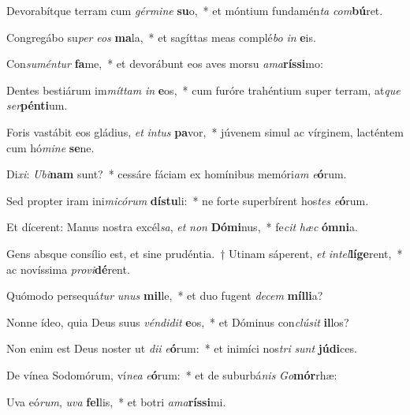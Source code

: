 \item Devorabítque terram cum \textit{gér}\textit{mi}\textit{ne} \textbf{su}o,~* et móntium fundamén\textit{ta} \textit{com}\textbf{bú}ret.
\item Congregábo su\textit{per} \textit{e}\textit{os} \textbf{ma}la,~* et sagíttas meas complé\textit{bo} \textit{in} \textbf{e}is.
\item Con\textit{su}\textit{mén}\textit{tur} \textbf{fa}me,~* et devorábunt eos aves morsu \textit{a}\textit{ma}\textbf{rís}\textbf{si}mo:
\item Dentes bestiárum im\textit{mít}\textit{tam} \textit{in} \textbf{e}os,~* cum furóre trahéntium super terram, at\textit{que} \textit{ser}\textbf{pén}\textbf{ti}um.
\item Foris vastábit eos gládius, \textit{et} \textit{in}\textit{tus} \textbf{pa}vor,~* júvenem simul ac vírginem, lacténtem cum hó\textit{mi}\textit{ne} \textbf{se}ne.
\item Di\textit{xi}: \textit{U}\textit{bi}\textbf{nam} sunt?~* cessáre fáciam ex homínibus memóri\textit{am} \textit{e}\textbf{ó}rum.
\item Sed propter iram ini\textit{mi}\textit{có}\textit{rum} \textbf{dís}\textbf{tu}li:~* ne forte superbírent hos\textit{tes} \textit{e}\textbf{ó}rum.
\item Et dícerent: Manus nostra excél\textit{sa}, \textit{et} \textit{non} \textbf{Dó}\textbf{mi}nus,~* fe\textit{cit} \textit{hæc} \textbf{óm}\textbf{ni}a.
\item Gens absque consílio est, et sine prudéntia.~† Utinam sáperent, \textit{et} \textit{in}\textit{tel}\textbf{lí}\textbf{ge}rent,~* ac novíssima \textit{pro}\textit{vi}\textbf{dé}rent.
\item Quómodo persequá\textit{tur} \textit{u}\textit{nus} \textbf{mil}le,~* et duo fugent \textit{de}\textit{cem} \textbf{míl}\textbf{li}a?
\item Nonne ídeo, quia Deus suus \textit{vén}\textit{di}\textit{dit} \textbf{e}os,~* et Dóminus con\textit{clú}\textit{sit} \textbf{il}los?
\item Non enim est Deus noster ut \textit{di}\textit{i} \textit{e}\textbf{ó}rum:~* et inimíci nos\textit{tri} \textit{sunt} \textbf{jú}\textbf{di}ces.
\item De vínea Sodomórum, ví\textit{ne}\textit{a} \textit{e}\textbf{ó}rum:~* et de suburbá\textit{nis} \textit{Go}\textbf{mór}rhæ:
\item Uva eó\textit{rum}, \textit{u}\textit{va} \textbf{fel}lis,~* et botri \textit{a}\textit{ma}\textbf{rís}\textbf{si}mi.
